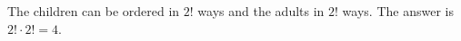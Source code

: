 The children can be ordered in $ 2!$ ways and the adults in $ 2!$ ways. The answer is $ 2!\cdot2!=\boxed4 $.
